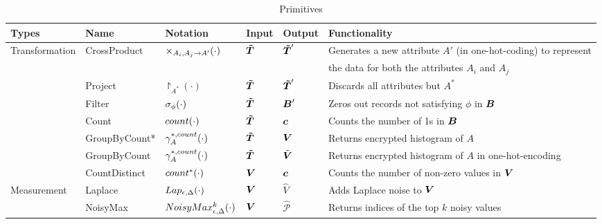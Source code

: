 

\begin{table*}
\small{
\caption {\system Primitives}\label{tab:primitives}
\begin{tabular}{|l|l|l|l|l|l|}
\hline
\bf{Types}                           & \bf{Name}         & \bf{Notation} & \bf{Input} & \bf{Output} & \bf{Functionality} \\ \hline \hline
\multirow{7}{*}{Transformation} & \multirow{2}{*}{\textsf{CrossProduct}} &  \multirow{2}{*}{$\times_{A_i,A_j\rightarrow A'}(\cdot)$} & 

\multirow{2}{*}{$\boldsymbol{\tilde{T}}$}   &  \multirow{2}{*}{$\boldsymbol{\tilde{T}}'$}   & Generates a new attribute  $A'$ (in one-hot-coding) to represent\\ & & & & & the data for both the attributes $A_i$ and $A_j$   \\ \cline{2-6}
                                & \textsf{Project}     & $\project_{A^*}(\cdot)$  &  $\boldsymbol{\tilde{T}}$       &  $\boldsymbol{\tilde{T}}'$       &  Discards all attributes but $A^*$ \\ \cline{2-6}
                                & \textsf{Filter}       & $\sigma_{\phi}(\cdot)$   &  $\boldsymbol{\tilde{T}}$      &   $\boldsymbol{B}'$     &  Zeros out records not satisfying $\phi$    in $\boldsymbol{B}$          \\ \cline{2-6}
                                & \textsf{Count}             & $count(\cdot)$         & $\boldsymbol{\tilde{T}}$  &  $\boldsymbol{c}$    &  Counts the number of 1s in $\boldsymbol{B}$               \\ \cline{2-6}
                                & \textsf{GroupByCount*}             & $\gamma^{*,count}_{A}(\cdot)$ &  $\boldsymbol{\tilde{T}}$  & $\boldsymbol{V}$    & Returns encrypted histogram of $A$                \\ \cline{2-6}
                                & \textsf{GroupByCount}              & $\gamma^{*,count}_{A}(\cdot)$    &$\boldsymbol{\tilde{T}}$       & $\tilde{\boldsymbol{V}}$        &  Returns encrypted histogram of $A$ in one-hot-encoding    \\ \cline{2-6}
                                & \textsf{CountDistinct}             & $count^*(\cdot)$     &    $\boldsymbol{V}$   & $\boldsymbol{c}$   &  Counts the number of non-zero values in $\boldsymbol{V}$       \\ \hline
\multirow{2}{*}{Measurement}    & \textsf{Laplace}     & $Lap_{\epsilon,\Delta}(\cdot)$    &  $\boldsymbol{V}$      &   $\hat{V}$    &  Adds Laplace noise to $\boldsymbol{V}$    \\ \cline{2-6}
                                & \textsf{NoisyMax}     & $NoisyMax_{\epsilon,\Delta}^k(\cdot)$         & $\boldsymbol{V}$       &  $\hat{\mathcal{P}}$      &  %
                                Returns indices of the top $k$ noisy values              \\ \hline
\end{tabular}
}
\end{table*}


